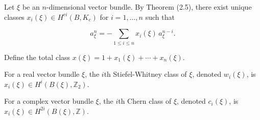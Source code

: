 Let $\xi$ be an $n$-dimensional vector bundle. By Theorem (2.5), there exist unique classes $x_i(\xi) \in H^{ci}(B, K_c)$ for $i = 1, \ldots, n$ such that

$$a_{\xi}^n = -\sum_{1 \leq i \leq n} x_i(\xi) \, a_{\xi}^{n-i}.$$

Define the total class $x(\xi) = 1 + x_1(\xi) + \cdots + x_n(\xi)$.

For a real vector bundle $\xi$, the $i$th Stiefel-Whitney class of $\xi$, denoted $w_i(\xi)$, is $x_i(\xi) \in H^i(B(\xi), \mathbb{Z}_2)$.

For a complex vector bundle $\xi$, the $i$th Chern class of $\xi$, denoted $c_i(\xi)$, is $x_i(\xi) \in H^{2i}(B(\xi), \mathbb{Z})$.
